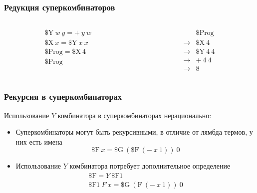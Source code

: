 \documentclass[aspectratio=169]{beamer}
\begin{document}
\begin{frame}
    \frametitle{Редукция суперкомбинаторов}

    \begin{columns}
        \begin{column}{0.2\textwidth}
            \begin{gather*}
                \text{\${}Y}\ w\ y = +\ y\ w \\
                \text{\${}X}\ x = \text{\${}Y}\ x\ x \\
                \text{\${}Prog} = \text{\${}X}\ 4 \\
                \hline
                \text{\${}Prog}
            \end{gather*}
        \end{column}
        \begin{column}{0.2\textwidth}
            \begin{align*}
                              & \text{\${}Prog}    \\
                \rightarrow{} & \text{\${}X}\ 4    \\
                \rightarrow{} & \text{\${}Y}\ 4\ 4 \\
                \rightarrow{} & +\ 4\ 4            \\
                \rightarrow{} & 8
            \end{align*}
        \end{column}
    \end{columns}

\end{frame}

\begin{frame}
    \frametitle{Рекурсия в суперкомбинаторах}

    Использование $Y$ комбинатора в суперкомбинаторах нерационально:
    \begin{itemize}
        \item Суперкомбинаторы могут быть рекурсивными, в отличие от лямбда термов, у них есть имена
              \[\text{\${}F}\ x = \text{\${}G}\ (\text{\${}F}\ (-\ x\ 1))\ 0\]
        \item Использование $Y$ комбинатора потребует дополнительное определение
              \begin{gather*}
                  \text{\${}F} = Y\ \text{\${}F1} \\
                  \text{\${}F1}\ F\ x = \text{\${}G}\ (\text{F}\ (-\ x\ 1))\ 0
              \end{gather*}
    \end{itemize}

\end{frame}
\end{document}
